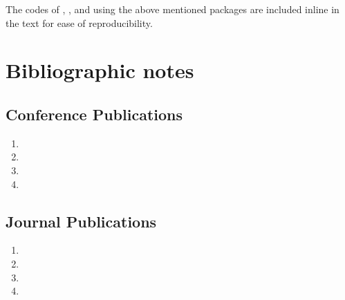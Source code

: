 The codes of , ,  and 
using the above mentioned packages are included inline in the text for ease of reproducibility.

\newpage

\section*{Bibliographic notes}

\subsection*{Conference Publications}

\begin{enumerate}

\item {}
\item {}
\item {}
\item {}

\end{enumerate}


\subsection*{Journal Publications}

\begin{enumerate}
\item {}
\item {}
\item {}
\item {}
\end{enumerate}
